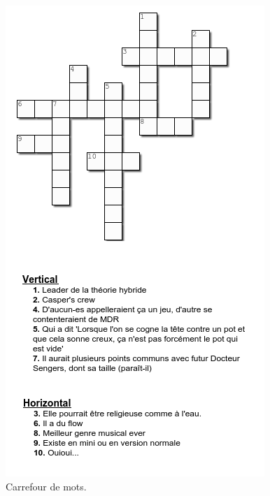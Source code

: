 \documentclass[a4paper]{leaflet}
\begin{document}
\begin{figure}
	\includegraphics[width=\textwidth]{mots.png}
	\caption{Carrefour de mots.}
\end{figure}
\end{document}
